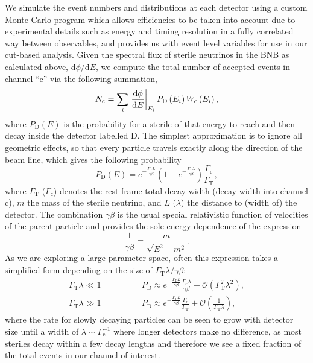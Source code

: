 \documentclass[11pt, a4paper]{article}
\def\ster{\ensuremath N}
\begin{document}
\begin{figure}[t]
\center

\end{figure}

We simulate the event numbers and distributions at each detector using a custom
Monte Carlo program which allows efficiencies to be taken into account due to
experimental details such as energy and timing resolution in a fully correlated
way between observables, and provides us with event level variables for use in
our cut-based analysis. 
%
Given the spectral flux of sterile neutrinos in the BNB as calculated above,
$\mathrm{d}\phi/\mathrm{d}E$, we compute the total number of accepted events in
channel ``$\text{c}$'' via the following summation,
%
\[ \ster_\text{c} = \sum_{i} \left .
\frac{\mathrm{d}\phi}{\mathrm{d}E}\right|_{E_i} P_\text{D}\left(E_i\right)
W_\text{c}\left(E_i\right),  \]
%
where $P_\text{D}(E)$ is the probability for a sterile of that energy to reach
and then decay inside the detector labelled $\text{D}$. The simplest
approximation is to ignore all geometric effects, so that every particle
travels exactly along the direction of the beam line, which gives the following
probability 
%
\[ P_\text{D}\left(E\right) = e^{-\frac{\Gamma_\text{T}L}{\gamma\beta}}\left(
1-
e^{-\frac{\Gamma_\text{T}\lambda}{\gamma\beta}}\right)\frac{\Gamma_\text{c}}{\Gamma_\text{T}},
\label{eq:prob} \]
%
where $\Gamma_\text{T}$ ($\Gamma_\text{c}$) denotes the rest-frame total decay
width (decay width into channel $\text{c}$), $m$ the mass of the sterile
neutrino, and $L$ ($\lambda$) the distance to (width of) the detector. The
combination $\gamma\beta$ is the usual special relativistic function of
velocities of the parent particle and provides the sole energy dependence of
the expression
%
\[   \frac{1}{\gamma\beta} \equiv \frac{m}{\sqrt{E^2-m^2}}. \]
%
As we are exploring a large parameter space, often this expression takes a
simplified form depending on the size of $\Gamma_\text{T}\lambda/\gamma\beta$:
%
\begin{align} 
%
\Gamma_\text{T}\lambda \ll 1\qquad&\qquad P_\text{D} \approx
e^{-\frac{\Gamma_\text{T}L}{\gamma\beta}}\frac{\Gamma_\text{c}\lambda}{\gamma\beta}
+ \mathcal{O}\left(\Gamma_\text{T}^2\lambda^2\right),\label{eq:prob_dec1}\\
%
\Gamma_\text{T}\lambda \gg 1\qquad&\qquad P_\text{D} \approx
e^{-\frac{\Gamma_\text{T}L}{\gamma\beta}}\frac{\Gamma_\text{c}}{\Gamma_\text{T}}
+ \mathcal{O}\left(\frac{1}{\Gamma_\text{T}\lambda}\right),
\label{eq:prob_dec2}
%
\end{align}
%
where the rate for slowly decaying particles can be seen to grow with detector
size until a width of $\lambda\sim\Gamma_\text{c}^{-1}$ where longer detectors
make no difference, as most steriles decay within a few decay lengths and
therefore we see a fixed fraction of the total events in our channel of
interest. 
\end{document}
